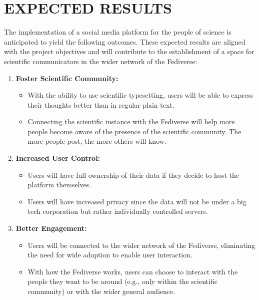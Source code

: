 \chapter{EXPECTED RESULTS}

The implementation of a social media platform for the people of science is anticipated to yield the following outcomes. These expected results are aligned with the project objectives and will contribute to the establishment of a space for scientific communicators in the wider network of the Fediverse:

\begin{enumerate}
    \item \textbf{Foster Scientific Community:} 
    \begin{itemize}
        \item With the ability to use scientific typesetting, users will be able to express their thoughts better than in regular plain text.
        \item Connecting the scientific instance with the Fediverse will help more people become aware of the presence of the scientific community. The more people post, the more others will know.
    \end{itemize}

    \item \textbf{Increased User Control:} 
    \begin{itemize}
        \item Users will have full ownership of their data if they decide to host the platform themselves.
        \item Users will have increased privacy since the data will not be under a big tech corporation but rather individually controlled servers. 
    \end{itemize}

    \item \textbf{Better Engagement:} 
    \begin{itemize}
        \item Users will be connected to the wider network of the Fediverse, eliminating the need for wide adoption to enable user interaction.
        \item With how the Fediverse works, users can choose to interact with the people they want to be around (e.g., only within the scientific community) or with the wider general audience.
    \end{itemize}
\end{enumerate}
